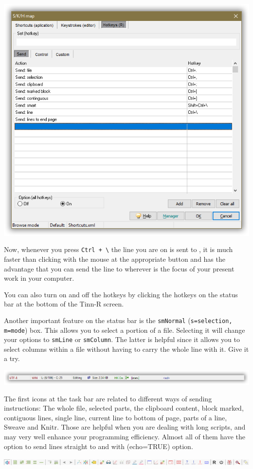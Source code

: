 \includegraphics[scale=0.40]{./res/hotkeys_send.png}

Now, whenever you press \texttt{Ctrl + \textbackslash{}} the line you are on is sent to \RR{},
it is much faster than clicking with the mouse at the appropriate button and has the advantage
that you can send the line to \RR{} wherever is the focus of your present work in your computer.

You can also turn on and off the hotkeys by clicking the hotkeys on the status bar at the bottom of the Tinn-R screen.

Another important feature on the status bar is the \texttt{smNormal} (\texttt{s=selection, m=mode}) box.
This allows you to select a portion of a file.
Selecting it will change your options to \texttt{smLine} or \texttt{smColumn}.
The latter is helpful since it allows you to select columns within a file without having to carry the whole line with it.
Give it a try.

\includegraphics[scale=0.50]{./res/status_bar.png}

The first icons at the \RR{} task bar are related to different ways of sending instructions:
The whole file, selected parts, the clipboard content, block marked, contiguous lines, single line,
current line to bottom of page, parts of a line, Sweave and Knitr.
Those are helpful when you are dealing with long scripts,
and may very well enhance your programming efficiency.
Almost all of them have the option to send lines straight to \RR{} and with (echo=TRUE) option.

\includegraphics[scale=0.50]{./res/secrets_rtoolbar.png}
